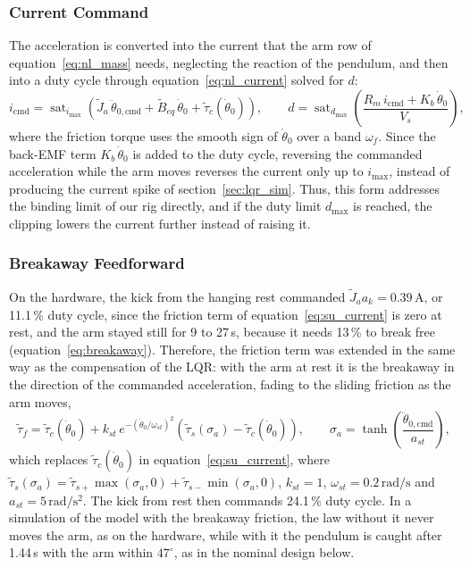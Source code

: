\documentclass[a4paper,11pt]{article}
\begin{document}
\subsubsection{Current Command}
The acceleration is converted into the current that the arm row of equation~\ref{eq:nl_mass} needs, neglecting the reaction of the pendulum, and then into a duty cycle through equation~\ref{eq:nl_current} solved for $d$:
\begin{equation}
  i_{\mathrm{cmd}} = \operatorname{sat}_{i_{\max}}\!\left( \tilde J_a\, \ddot\theta_{0,\mathrm{cmd}} + \tilde B_{eq}\, \dot\theta_0 + \tilde\tau_c(\dot\theta_0) \right), \qquad
  d = \operatorname{sat}_{d_{\max}}\!\left( \frac{R_m\, i_{\mathrm{cmd}} + K_b\, \dot\theta_0}{V_s} \right),
  \label{eq:su_current}
\end{equation}
where the friction torque uses the smooth sign of $\dot\theta_0$ over a band $\omega_f$. Since the back-EMF term $K_b\,\dot\theta_0$ is added to the duty cycle, reversing the commanded acceleration while the arm moves reverses the current only up to $i_{\max}$, instead of producing the current spike of section~\ref{sec:lqr_sim}. Thus, this form addresses the binding limit of our rig directly, and if the duty limit $d_{\max}$ is reached, the clipping lowers the current further instead of raising it.

\subsubsection{Breakaway Feedforward}
\label{sec:su_stick}
On the hardware, the kick from the hanging rest commanded $\tilde J_a a_k = 0.39\,\mathrm{A}$, or 11.1\,\% duty cycle, since the friction term of equation~\ref{eq:su_current} is zero at rest, and the arm stayed still for 9 to 27\,s, because it needs 13\,\% to break free (equation~\ref{eq:breakaway}). Therefore, the friction term was extended in the same way as the compensation of the LQR: with the arm at rest it is the breakaway in the direction of the commanded acceleration, fading to the sliding friction as the arm moves,
\begin{equation}
  \tilde\tau_f = \tilde\tau_c(\dot\theta_0) + k_{st}\, e^{-(\dot\theta_0/\omega_{st})^2} \left( \tilde\tau_s(\sigma_a) - \tilde\tau_c(\dot\theta_0) \right), \qquad \sigma_a = \tanh\!\left(\frac{\ddot\theta_{0,\mathrm{cmd}}}{a_{st}}\right),
  \label{eq:su_stick}
\end{equation}
which replaces $\tilde\tau_c(\dot\theta_0)$ in equation~\ref{eq:su_current}, where $\tilde\tau_s(\sigma_a) = \tilde\tau_{s+}\max(\sigma_a, 0) + \tilde\tau_{s-}\min(\sigma_a, 0)$, $k_{st} = 1$, $\omega_{st} = 0.2\,\mathrm{rad/s}$ and $a_{st} = 5\,\mathrm{rad/s^2}$. The kick from rest then commands 24.1\,\% duty cycle. In a simulation of the model with the breakaway friction, the law without it never moves the arm, as on the hardware, while with it the pendulum is caught after 1.44\,s with the arm within $47^\circ$, as in the nominal design below.
\end{document}
